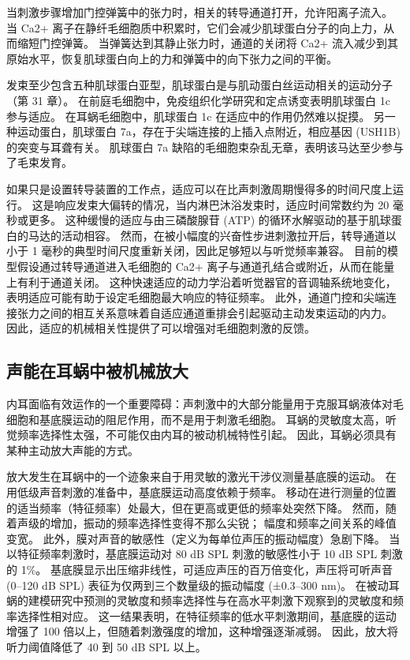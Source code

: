 当刺激步骤增加门控弹簧中的张力时，相关的转导通道打开，允许阳离子流入。 当 Ca2+ 离子在静纤毛细胞质中积累时，它们会减少肌球蛋白分子的向上力，从而缩短门控弹簧。 当弹簧达到其静止张力时，通道的关闭将 Ca2+ 流入减少到其原始水平，恢复肌球蛋白向上的力和弹簧中的向下张力之间的平衡。

发束至少包含五种肌球蛋白亚型，肌球蛋白是与肌动蛋白丝运动相关的运动分子（第 31 章）。 在前庭毛细胞中，免疫组织化学研究和定点诱变表明肌球蛋白 1c 参与适应。 在耳蜗毛细胞中，肌球蛋白 1c 在适应中的作用仍然难以捉摸。 另一种运动蛋白，肌球蛋白 7a，存在于尖端连接的上插入点附近，相应基因 (USH1B) 的突变与耳聋有关。 肌球蛋白 7a 缺陷的毛细胞束杂乱无章，表明该马达至少参与了毛束发育。

如果只是设置转导装置的工作点，适应可以在比声刺激周期慢得多的时间尺度上运行。 这是响应发束大偏转的情况，当内淋巴沐浴发束时，适应时间常数约为 20 毫秒或更多。 这种缓慢的适应与由三磷酸腺苷 (ATP) 的循环水解驱动的基于肌球蛋白的马达的活动相容。 然而，在被小幅度的兴奋性步进刺激拉开后，转导通道以小于 1 毫秒的典型时间尺度重新关闭，因此足够短以与听觉频率兼容。 目前的模型假设通过转导通道进入毛细胞的 Ca2+ 离子与通道孔结合或附近，从而在能量上有利于通道关闭。 这种快速适应的动力学沿着听觉器官的音调轴系统地变化，表明适应可能有助于设定毛细胞最大响应的特征频率。 此外，通道门控和尖端连接张力之间的相互关系意味着自适应通道重排会引起驱动主动发束运动的内力。 因此，适应的机械相关性提供了可以增强对毛细胞刺激的反馈。

\subsection{声能在耳蜗中被机械放大}
内耳面临有效运作的一个重要障碍：声刺激中的大部分能量用于克服耳蜗液体对毛细胞和基底膜运动的阻尼作用，而不是用于刺激毛细胞。 耳蜗的灵敏度太高，听觉频率选择性太强，不可能仅由内耳的被动机械特性引起。 因此，耳蜗必须具有某种主动放大声能的方式。

放大发生在耳蜗中的一个迹象来自于用灵敏的激光干涉仪测量基底膜的运动。 在用低级声音刺激的准备中，基底膜运动高度依赖于频率。 移动在进行测量的位置的适当频率（特征频率）处最大，但在更高或更低的频率处突然下降。 然而，随着声级的增加，振动的频率选择性变得不那么尖锐； 幅度和频率之间关系的峰值变宽。 此外，膜对声音的敏感性（定义为每单位声压的振动幅度）急剧下降。 当以特征频率刺激时，基底膜运动对 80 dB SPL 刺激的敏感性小于 10 dB SPL 刺激的 1\%。 基底膜显示出压缩非线性，可适应声压的百万倍变化，声压将可听声音 (0–120 dB SPL) 表征为仅两到三个数量级的振动幅度 (±0.3–300 nm)。 在被动耳蜗的建模研究中预测的灵敏度和频率选择性与在高水平刺激下观察到的灵敏度和频率选择性相对应。 这一结果表明，在特征频率的低水平刺激期间，基底膜的运动增强了 100 倍以上，但随着刺激强度的增加，这种增强逐渐减弱。 因此，放大将听力阈值降低了 40 到 50 dB SPL 以上。


